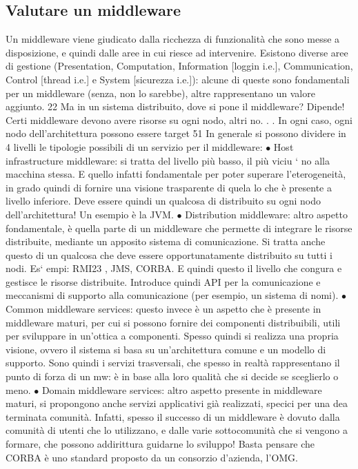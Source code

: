 \subsection{Valutare un middleware}
Un middleware viene giudicato dalla ricchezza di funzionalità che sono messe a
disposizione, e quindi dalle aree in cui riesce ad intervenire. Esistono diverse
aree di gestione (Presentation, Computation, Information [loggin i.e.], Communication, Control [thread i.e.] e System
[sicurezza i.e.]): alcune di queste sono
fondamentali per un middleware (senza, non lo sarebbe), altre rappresentano
un valore aggiunto.
22 Ma in un sistema distribuito, dove si pone il middleware? Dipende! Certi middleware
devono avere risorse su ogni nodo, altri no. . . In ogni caso, ogni nodo dell'architettura possono
essere target
51
In generale si possono dividere in 4 livelli le tipologie possibili di un servizio
per il middleware:
$\bullet$ Host infrastructure middleware: si tratta del livello più basso, il più viciu
`
no alla macchina stessa. E quello infatti fondamentale per poter superare
l'eterogeneità, in grado quindi di fornire una visione trasparente di quela
lo che è presente a livello inferiore. Deve essere quindi un qualcosa di
distribuito su ogni nodo dell'architettura! Un esempio è la JVM.
$\bullet$ Distribution middleware: altro aspetto fondamentale, è quella parte di un
middleware che permette di integrare le risorse distribuite, mediante un
apposito sistema di comunicazione. Si tratta anche questo di un qualcosa che deve essere opportunatamente distribuito su
tutti i nodi. Es`
empi: RMI23 , JMS, CORBA. E quindi questo il livello che congura e
gestisce le risorse distribuite. Introduce quindi API per la comunicazione
e meccanismi di supporto alla comunicazione (per esempio, un sistema di
nomi).
$\bullet$ Common middleware services: questo invece è un aspetto che è presente in
middleware maturi, per cui si possono fornire dei componenti distribuibili,
utili per sviluppare in un'ottica a componenti. Spesso quindi si realizza
una propria visione, ovvero il sistema si basa su un'architettura comune
e un modello di supporto. Sono quindi i servizi trasversali, che spesso in
realtà rappresentano il punto di forza di un mw: è in base alla loro qualità
che si decide se sceglierlo o meno.
$\bullet$ Domain middleware services: altro aspetto presente in middleware maturi,
si propongono anche servizi applicativi già realizzati, specici per una dea
terminata comunità. Infatti, spesso il successo di un middleware è dovuto
dalla comunità di utenti che lo utilizzano, e dalle varie sottocomunità che
si vengono a formare, che possono addirittura guidarne lo sviluppo! Basta
pensare che CORBA è uno standard proposto da un consorzio d'azienda,
l'OMG.
